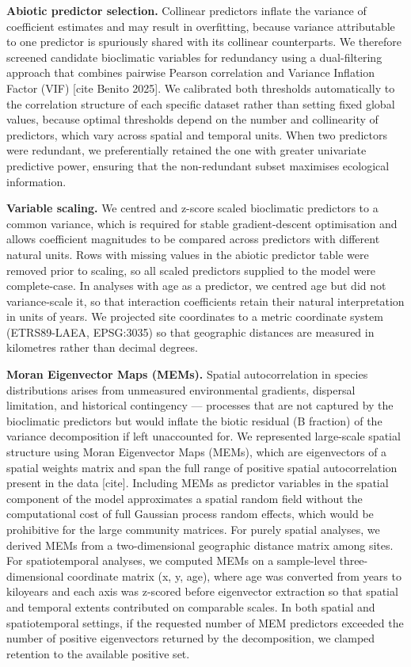 \documentclass[
  12pt,
]{article}
\begin{document}
\textbf{Abiotic predictor selection.} Collinear predictors inflate the
variance of coefficient estimates and may result in overfitting, because
variance attributable to one predictor is spuriously shared with its
collinear counterparts. We therefore screened candidate bioclimatic
variables for redundancy using a dual-filtering approach that combines
pairwise Pearson correlation and Variance Inflation Factor (VIF) {[}cite
Benito 2025{]}. We calibrated both thresholds automatically to the
correlation structure of each specific dataset rather than setting fixed
global values, because optimal thresholds depend on the number and
collinearity of predictors, which vary across spatial and temporal
units. When two predictors were redundant, we preferentially retained
the one with greater univariate predictive power, ensuring that the
non-redundant subset maximises ecological information.

\textbf{Variable scaling.} We centred and z-score scaled bioclimatic
predictors to a common variance, which is required for stable
gradient-descent optimisation and allows coefficient magnitudes to be
compared across predictors with different natural units. Rows with
missing values in the abiotic predictor table were removed prior to
scaling, so all scaled predictors supplied to the model were
complete-case. In analyses with age as a predictor, we centred age but
did not variance-scale it, so that interaction coefficients retain their
natural interpretation in units of years. We projected site coordinates
to a metric coordinate system (ETRS89-LAEA, EPSG:3035) so that
geographic distances are measured in kilometres rather than decimal
degrees.

\textbf{Moran Eigenvector Maps (MEMs).} Spatial autocorrelation in
species distributions arises from unmeasured environmental gradients,
dispersal limitation, and historical contingency --- processes that are
not captured by the bioclimatic predictors but would inflate the biotic
residual (B fraction) of the variance decomposition if left unaccounted
for. We represented large-scale spatial structure using Moran
Eigenvector Maps (MEMs), which are eigenvectors of a spatial weights
matrix and span the full range of positive spatial autocorrelation
present in the data {[}cite{]}. Including MEMs as predictor variables in
the spatial component of the model approximates a spatial random field
without the computational cost of full Gaussian process random effects,
which would be prohibitive for the large community matrices. For purely
spatial analyses, we derived MEMs from a two-dimensional geographic
distance matrix among sites. For spatiotemporal analyses, we computed
MEMs on a sample-level three-dimensional coordinate matrix (x, y, age),
where age was converted from years to kiloyears and each axis was
z-scored before eigenvector extraction so that spatial and temporal
extents contributed on comparable scales. In both spatial and
spatiotemporal settings, if the requested number of MEM predictors
exceeded the number of positive eigenvectors returned by the
decomposition, we clamped retention to the available positive set.
\end{document}
